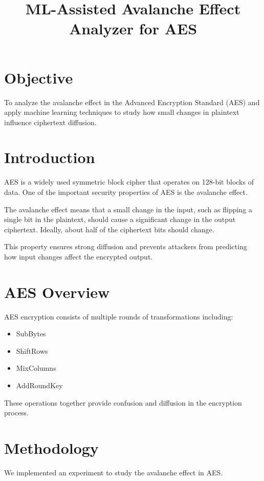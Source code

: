 \documentclass{article}
\title{ML-Assisted Avalanche Effect Analyzer for AES}
\author{}
\date{}
\begin{document}
\maketitle

\section{Objective}

To analyze the avalanche effect in the Advanced Encryption Standard (AES) and apply machine learning techniques to study how small changes in plaintext influence ciphertext diffusion.

\section{Introduction}

AES is a widely used symmetric block cipher that operates on 128-bit blocks of data. One of the important security properties of AES is the avalanche effect. 

The avalanche effect means that a small change in the input, such as flipping a single bit in the plaintext, should cause a significant change in the output ciphertext. Ideally, about half of the ciphertext bits should change.

This property ensures strong diffusion and prevents attackers from predicting how input changes affect the encrypted output.

\section{AES Overview}

AES encryption consists of multiple rounds of transformations including:

\begin{itemize}
\item SubBytes
\item ShiftRows
\item MixColumns
\item AddRoundKey
\end{itemize}

These operations together provide confusion and diffusion in the encryption process.

\section{Methodology}

We implemented an experiment to study the avalanche effect in AES.
\end{document}
